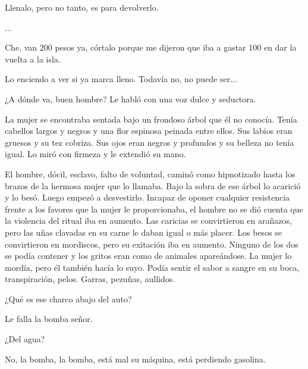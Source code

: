 \documentclass[11pt,twoside,openright,a6paper]{book}
\begin{document}
Llenalo, pero no tanto, es para devolverlo.

...

Che, van 200 pesos ya, córtalo porque me dijeron que iba a gastar 100 en
dar la vuelta a la isla.

Lo enciendo a ver si ya marca lleno. Todavía no,
no puede ser...


\vspace{0.5cm}
\hrulefill\hspace{0.2cm} \decofourleft\decofourright \hspace{0.2cm} \hrulefill
\vspace{0.5cm}

¿A dónde va, buen hombre? Le habló con una voz dulce y seductora.

La mujer se encontraba sentada bajo un frondoso árbol que él no
conocía. Tenía cabellos largos y negros y una flor espinosa peinada entre
ellos. Sus labios eran gruesos y su tez cobriza. Sus ojos eran negros y
profundos y su belleza no tenía igual. Lo miró con firmeza y le extendió
su mano.

El hombre, dócil, esclavo, falto de voluntad, caminó como hipnotizado hasta
los brazos de la hermosa mujer que lo llamaba. Bajo la sobra de ese árbol
lo acarició y lo besó. Luego empezó a desvestirlo. Incapaz de oponer
cualquier resistencia frente a los favores que la mujer le proporcionaba,
el hombre no se dió cuenta que la violencia del ritual iba en aumento. Las
caricias se convirtieron en arañazos, pero las uñas clavadas en su carne
le daban igual o más placer. Los besos se convirtieron en mordiscos, pero
su exitación iba en aumento. Ninguno de los dos se podía contener y
los gritos eran como de animales apareándose. La mujer lo mordía, pero
él también hacía lo suyo. Podía sentir el sabor a sangre en su boca,
transpiración, pelos. Garras, pezuñas, aullidos.


\vspace{0.5cm}
\hrulefill\hspace{0.2cm} \decofourleft\decofourright \hspace{0.2cm} \hrulefill
\vspace{0.5cm}

¿Qué es ese charco abajo del auto?

Le falla la bomba señor.

¿Del agua?

No, la bomba, la bomba, está mal su máquina, está perdiendo gasolina.


\vspace{0.5cm}
\hrulefill\hspace{0.2cm} \decofourleft\decofourright \hspace{0.2cm} \hrulefill
\vspace{0.5cm}
\end{document}
